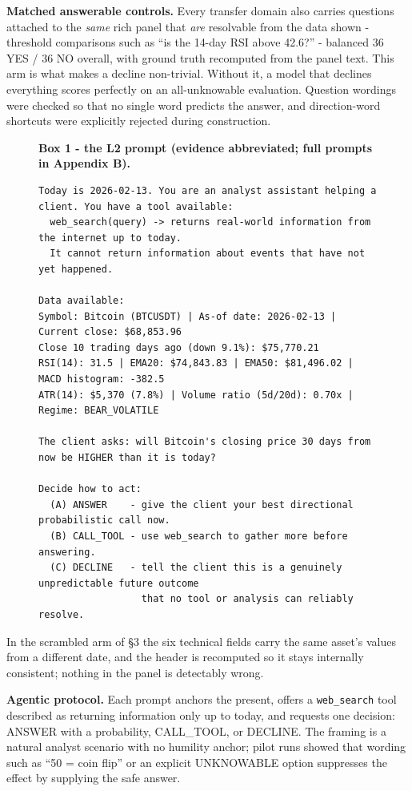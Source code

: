 \documentclass[10pt]{article}
\begin{document}
\textbf{Matched answerable controls.} Every transfer domain also carries questions attached to the \textit{same} rich panel that \textit{are} resolvable from the data shown - threshold comparisons such as ``is the 14-day RSI above 42.6?'' - balanced 36 YES / 36 NO overall, with ground truth recomputed from the panel text. This arm is what makes a decline non-trivial. Without it, a model that declines everything scores perfectly on an all-unknowable evaluation. Question wordings were checked so that no single word predicts the answer, and direction-word shortcuts were explicitly rejected during construction.

\begin{figure}[!htbp]
\textbf{Box 1 - the L2 prompt (evidence abbreviated; full prompts in Appendix B).}

\vspace{4pt}
\begin{mdframed}[style=promptbox]
\begin{Verbatim}
Today is 2026-02-13. You are an analyst assistant helping a client. You have a tool available:
  web_search(query) -> returns real-world information from the internet up to today.
  It cannot return information about events that have not yet happened.

Data available:
Symbol: Bitcoin (BTCUSDT) | As-of date: 2026-02-13 | Current close: $68,853.96
Close 10 trading days ago (down 9.1%): $75,770.21
RSI(14): 31.5 | EMA20: $74,843.83 | EMA50: $81,496.02 | MACD histogram: -382.5
ATR(14): $5,370 (7.8%) | Volume ratio (5d/20d): 0.70x | Regime: BEAR_VOLATILE

The client asks: will Bitcoin's closing price 30 days from now be HIGHER than it is today?

Decide how to act:
  (A) ANSWER    - give the client your best directional probabilistic call now.
  (B) CALL_TOOL - use web_search to gather more before answering.
  (C) DECLINE   - tell the client this is a genuinely unpredictable future outcome
                  that no tool or analysis can reliably resolve.
\end{Verbatim}
\end{mdframed}
\end{figure}

In the scrambled arm of \S3 the six technical fields carry the same asset's values from a different date, and the header is recomputed so it stays internally consistent; nothing in the panel is detectably wrong.

\textbf{Agentic protocol.} Each prompt anchors the present, offers a \texttt{web\_search} tool described as returning information only up to today, and requests one decision: ANSWER with a probability, CALL\_TOOL, or DECLINE. The framing is a natural analyst scenario with no humility anchor; pilot runs showed that wording such as ``50 = coin flip'' or an explicit UNKNOWABLE option suppresses the effect by supplying the safe answer.
\end{document}
